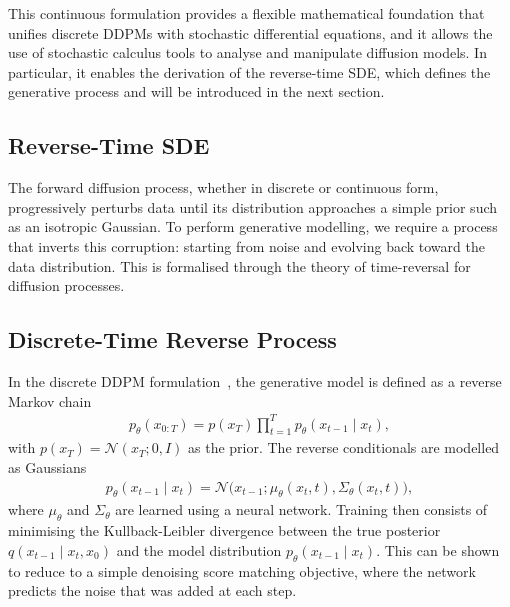 \documentclass[a4paper,12pt]{article}
\begin{document}
This continuous formulation provides a flexible mathematical foundation that unifies discrete DDPMs with stochastic differential equations, and it allows the use of stochastic calculus tools to analyse and manipulate diffusion models. 
In particular, it enables the derivation of the reverse-time SDE, which defines the generative process and will be introduced in the next section.

\subsection{Reverse-Time SDE}
The forward diffusion process, whether in discrete or continuous form, progressively perturbs data until its distribution approaches a simple prior such as an isotropic Gaussian. 
To perform generative modelling, we require a process that inverts this corruption: starting from noise and evolving back toward the data distribution. 
This is formalised through the theory of time-reversal for diffusion processes.
\subsection{Discrete-Time Reverse Process}
In the discrete DDPM formulation~\cite{hoDenoisingDiffusionProbabilistic2020}, the generative model is defined as a reverse Markov chain
\begin{align*}
    p_\theta\left(x_{0:T}\right) = p(x_T) \prod_{t=1}^{T} p_\theta(x_{t-1} \mid x_t),
\end{align*}
with \(p(x_T) = \mathcal{N}(x_T;0,I)\) as the prior. The reverse conditionals are modelled as Gaussians
\begin{align*}
    p_\theta\left(x_{t-1} \mid x_t\right) = \mathcal{N}\!\big(x_{t-1}; \mu_\theta(x_t,t), \Sigma_\theta(x_t,t)\big),
\end{align*}
where \(\mu_\theta\) and \(\Sigma_\theta\) are learned using a neural network. Training then consists of minimising the Kullback-Leibler divergence between the true posterior \(q(x_{t-1} \mid x_t, x_0)\) and the model distribution \(p_\theta(x_{t-1} \mid x_t)\). This can be shown to reduce to a simple denoising score matching objective, where the network predicts the noise that was added at each step.
\end{document}
